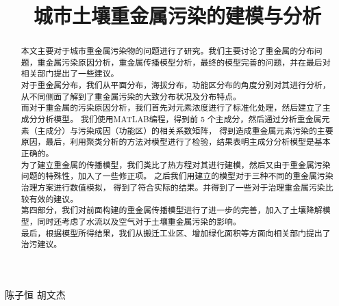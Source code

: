 \documentclass[a4paper]{article}
\title{城市土壤重金属污染的建模与分析}
\author{}
\date{}
\begin{document}
%

\maketitle

\begin{center}
陈子恒    \qquad   胡文杰 
\end{center}

\begin{large}
	\begin{flushright}
		
	\end{flushright}
\end{large}
\ \ \\\\

\begin{abstract}
\textit{}
本文主要对于城市重金属污染物的问题进行了研究。我们主要讨论了重金属的分布问题，重金属污染原因分析，重金属传播模型分析，最终的模型完善的问题，并在最后对相关部门提出了一些建议。 \\
\indent 对于重金属分布，我们从平面分布，海拔分布，功能区分布的角度分别对其进行分析，从不同侧面了解到了重金属污染的大致分布状况及分布特点。\\
\indent 而对于重金属的污染原因分析，我们首先对元素浓度进行了标准化处理，然后建立了主成分分析模型。
我们使用MATLAB编程，得到前 5 个主成分，然后通过分析重金属元素（主成分）与污染成因（功能区）的相关系数矩阵，
得到造成重金属元素污染的主要原因，最后，利用聚类分析的方法对模型进行了检验，结果表明主成分分析模型是基本正确的。\\
\indent 为了建立重金属的传播模型，我们类比了热方程对其进行建模，然后又由于重金属污染问题的特殊性，加入了一些修正项。
之后我们用建立的模型对于三种不同的重金属污染治理方案进行数值模拟，
得到了符合实际的结果。并得到了一些对于治理重金属污染比较有效的建议。 \\
\indent 第四部分，我们对前面构建的重金属传播模型进行了进一步的完善，加入了土壤降解模型，同时还考虑了水流以及空气对于土壤重金属污染的影响。\\
\indent 最后，根据模型所得结果，我们从搬迁工业区、增加绿化面积等方面向相关部门提出了治污建议。 

\end{abstract}
\end{document}
